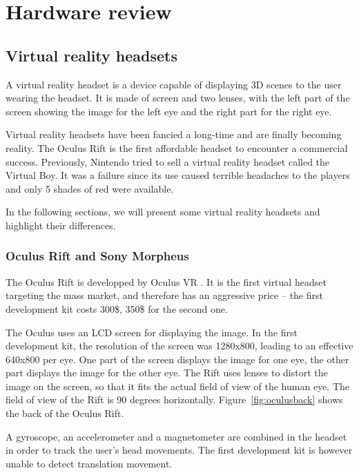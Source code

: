 \documentclass[12pt, twoside]{article}
\let\oldsection\section
\def\section{\cleardoublepage\oldsection}
\begin{document}
\section{Hardware review}
\subsection{Virtual reality headsets}
A virtual reality headset is a device capable of displaying 3D scenes to the user wearing the headset. It is made of screen and two lenses, with the left part of the screen showing the image for the left eye and the right part for the right eye.

Virtual reality headsets have been fancied a long-time and are finally becoming reality. The Oculus Rift is the first affordable headset to encounter a commercial success. Previously, Nintendo tried to sell a virtual reality headset called the Virtual Boy. It was a failure since its use caused terrible headaches to the players and only 5 shades of red were available.

In the following sections, we will present some virtual reality headsets and highlight their differences.

\subsubsection{Oculus Rift and Sony Morpheus}
The Oculus Rift is developped by Oculus VR \cite{Oculus}. It is the first virtual headset targeting the mass market, and therefore has an aggressive price -- the first development kit costs 300\$, 350\$ for the second one.

The Oculus uses an LCD screen for displaying the image. In the first development kit, the resolution of the screen was 1280x800, leading to an effective 640x800 per eye. One part of the screen displays the image for one eye, the other part displays the image for the other eye. The Rift uses lenses to distort the image on the screen, so that it fits the actual field of view of the human eye. The field of view of the Rift is 90 degrees horizontally. Figure~\ref{fig:oculusback} shows the back of the Oculus Rift.

A gyroscope, an accelerometer and a magnetometer are combined in the headset in order to track the user's head movements. The first development kit is however unable to detect translation movement.
\end{document}
